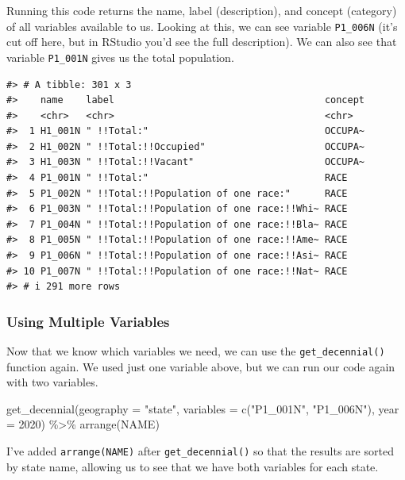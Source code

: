 \documentclass[
]{book}
\newenvironment{Shaded}{\begin{snugshade}}{\end{snugshade}}
\newcommand{\AttributeTok}[1]{\textcolor[rgb]{0.77,0.63,0.00}{#1}}
\newcommand{\DecValTok}[1]{\textcolor[rgb]{0.00,0.00,0.81}{#1}}
\newcommand{\FunctionTok}[1]{\textcolor[rgb]{0.00,0.00,0.00}{#1}}
\newcommand{\NormalTok}[1]{#1}
\newcommand{\SpecialCharTok}[1]{\textcolor[rgb]{0.00,0.00,0.00}{#1}}
\newcommand{\StringTok}[1]{\textcolor[rgb]{0.31,0.60,0.02}{#1}}
\begin{document}
Running this code returns the name, label (description), and concept (category) of all variables available to us. Looking at this, we can see variable \texttt{P1\_006N} (it's cut off here, but in RStudio you'd see the full description). We can also see that variable \texttt{P1\_001N} gives us the total population.

\begin{verbatim}
#> # A tibble: 301 x 3
#>    name    label                                     concept
#>    <chr>   <chr>                                     <chr>  
#>  1 H1_001N " !!Total:"                               OCCUPA~
#>  2 H1_002N " !!Total:!!Occupied"                     OCCUPA~
#>  3 H1_003N " !!Total:!!Vacant"                       OCCUPA~
#>  4 P1_001N " !!Total:"                               RACE   
#>  5 P1_002N " !!Total:!!Population of one race:"      RACE   
#>  6 P1_003N " !!Total:!!Population of one race:!!Whi~ RACE   
#>  7 P1_004N " !!Total:!!Population of one race:!!Bla~ RACE   
#>  8 P1_005N " !!Total:!!Population of one race:!!Ame~ RACE   
#>  9 P1_006N " !!Total:!!Population of one race:!!Asi~ RACE   
#> 10 P1_007N " !!Total:!!Population of one race:!!Nat~ RACE   
#> # i 291 more rows
\end{verbatim}

\hypertarget{using-multiple-variables}{%
\subsubsection*{Using Multiple Variables}\label{using-multiple-variables}}

Now that we know which variables we need, we can use the \texttt{get\_decennial()} function again. We used just one variable above, but we can run our code again with two variables.

\begin{Shaded}
\begin{Highlighting}[]
\FunctionTok{get\_decennial}\NormalTok{(}\AttributeTok{geography =} \StringTok{"state"}\NormalTok{, }
              \AttributeTok{variables =} \FunctionTok{c}\NormalTok{(}\StringTok{"P1\_001N"}\NormalTok{, }\StringTok{"P1\_006N"}\NormalTok{),}
              \AttributeTok{year =} \DecValTok{2020}\NormalTok{) }\SpecialCharTok{\%\textgreater{}\%} 
  \FunctionTok{arrange}\NormalTok{(NAME)}
\end{Highlighting}
\end{Shaded}

I've added \texttt{arrange(NAME)} after \texttt{get\_decennial()} so that the results are sorted by state name, allowing us to see that we have both variables for each state.
\end{document}
